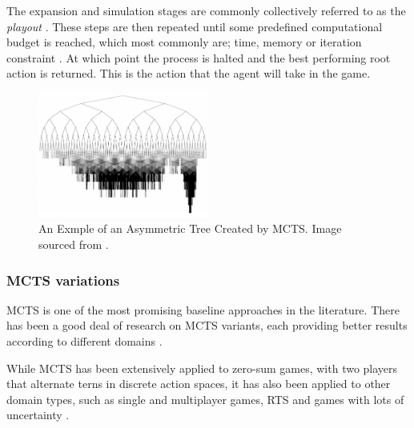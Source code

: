 \documentclass[journal]{IEEEtran}
\begin{document}
			The expansion and simulation stages are commonly collectively referred to as the \textit{playout} \cite{powley2014information}.
			These steps are then repeated until some predefined computational budget is reached, which most commonly are; time, memory or iteration constraint \cite{browne2012survey}. At which point the process is halted and the best performing root action is returned. This is the action that the agent will take in the game.


		
		\begin{figure}[h]
		    \centering
		    \includegraphics[width=0.5\textwidth]{MCTSasymmetry}
		    \caption{An Exmple of an Asymmetric Tree Created by MCTS. Image sourced from \cite{coquelin2007bandit}. }
		    \label{fig:MCTS2}
		\end{figure}




		\subsubsection{MCTS variations} \label{sssec:MCTSvariations}
			MCTS is one of the most promising baseline approaches in the  literature.
			There has been a good deal of research on MCTS variants, each providing better results according to different domains \cite{browne2012survey, park2015mcts, perez2014knowledge, ilhan2017monte, de2016monte, frydenberg2015investigating}.

			While MCTS has been extensively applied to zero-sum games, with two players that alternate terns in discrete action spaces, it has also been applied to other domain types, such as single and multiplayer games, RTS and games with lots of uncertainty \cite{browne2012survey, de2016monte, frydenberg2015investigating}.
\end{document}
